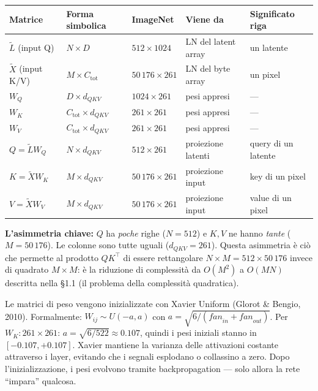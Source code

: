 \documentclass[
  11pt,
]{article}
\begin{document}
\begin{center}
\begin{tabular}{@{}lllll@{}}
\toprule
\textbf{Matrice} & \textbf{Forma simbolica} & \textbf{ImageNet} & \textbf{Viene da} & \textbf{Significato riga} \\
\midrule
$\tilde{L}$ (input Q) & $N \times D$ & $512 \times 1024$ & LN del latent array & un latente \\
$\tilde{X}$ (input K/V) & $M \times C_{\text{tot}}$ & $50\,176 \times 261$ & LN del byte array & un pixel \\
$W_Q$ & $D \times d_{QKV}$ & $1024 \times 261$ & pesi appresi & --- \\
$W_K$ & $C_{\text{tot}} \times d_{QKV}$ & $261 \times 261$ & pesi appresi & --- \\
$W_V$ & $C_{\text{tot}} \times d_{QKV}$ & $261 \times 261$ & pesi appresi & --- \\
\midrule
$Q = \tilde{L} W_Q$ & $N \times d_{QKV}$ & $512 \times 261$ & proiezione latenti & query di un latente \\
$K = \tilde{X} W_K$ & $M \times d_{QKV}$ & $50\,176 \times 261$ & proiezione input & key di un pixel \\
$V = \tilde{X} W_V$ & $M \times d_{QKV}$ & $50\,176 \times 261$ & proiezione input & value di un pixel \\
\bottomrule
\end{tabular}
\end{center}

\textbf{L'asimmetria chiave:} $Q$ ha \emph{poche} righe ($N = 512$) e $K, V$ ne hanno \emph{tante} ($M = 50\,176$). Le colonne sono tutte uguali ($d_{QKV} = 261$). Questa asimmetria è ciò che permette al prodotto $QK^\top$ di essere rettangolare $N \times M = 512 \times 50\,176$ invece di quadrato $M \times M$: è la riduzione di complessità da $O(M^2)$ a $O(MN)$ descritta nella §1.1 (il problema della complessità quadratica).

\begin{notabox}[title={\textbf{Inizializzazione di $W_Q$, $W_K$, $W_V$: Xavier Uniform}}]
Le matrici di peso vengono inizializzate con Xavier Uniform (Glorot \& Bengio, 2010). Formalmente: $W_{ij} \sim U(-a, a)$ con $a = \sqrt{6 / (\mathit{fan}_{in} + \mathit{fan}_{out})}$. Per $W_K: 261 \times 261$: $a = \sqrt{6/522} \approx 0.107$, quindi i pesi iniziali stanno in $[-0.107, +0.107]$. Xavier mantiene la varianza delle attivazioni costante attraverso i layer, evitando che i segnali esplodano o collassino a zero. Dopo l'inizializzazione, i pesi evolvono tramite backpropagation --- solo allora la rete ``impara'' qualcosa.
\end{notabox}
\end{document}
